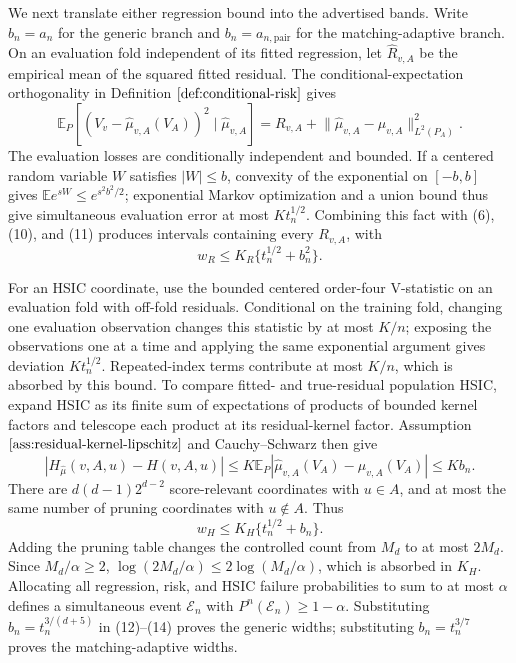 We next translate either regression bound into the advertised bands. Write \(b_n=a_n\) for the generic branch and \(b_n=a_{n,\mathrm{pair}}\) for the matching-adaptive branch. On an evaluation fold independent of its fitted regression, let \(\widehat R_{v,A}\) be the empirical mean of the squared fitted residual. The conditional-expectation orthogonality in Definition \(\ref{def:conditional-risk}\) gives
\[
 \mathbb E_P\!\left[(V_v-\widehat\mu_{v,A}(V_A))^2\mid\widehat\mu_{v,A}\right]
 =R_{v,A}+\lVert\widehat\mu_{v,A}-\mu_{v,A}\rVert_{L^2(P_A)}^2. \tag{11}
\]
The evaluation losses are conditionally independent and bounded. If a centered random variable \(W\) satisfies \(|W|\le b\), convexity of the exponential on \([-b,b]\) gives \(\mathbb E e^{sW}\le e^{s^2b^2/2}\); exponential Markov optimization and a union bound thus give simultaneous evaluation error at most \(K t_n^{1/2}\). Combining this fact with (6), (10), and (11) produces intervals containing every \(R_{v,A}\), with
\[
 w_R\le K_R\{t_n^{1/2}+b_n^2\}. \tag{12}
\]

For an HSIC coordinate, use the bounded centered order-four V-statistic on an evaluation fold with off-fold residuals. Conditional on the training fold, changing one evaluation observation changes this statistic by at most \(K/n\); exposing the observations one at a time and applying the same exponential argument gives deviation \(K t_n^{1/2}\). Repeated-index terms contribute at most \(K/n\), which is absorbed by this bound. To compare fitted- and true-residual population HSIC, expand HSIC as its finite sum of expectations of products of bounded kernel factors and telescope each product at its residual-kernel factor. Assumption \(\ref{ass:residual-kernel-lipschitz}\) and Cauchy--Schwarz then give
\[
 \left|H_{\widehat\mu}(v,A,u)-H(v,A,u)\right|
 \le K\mathbb E_P
 \left|\widehat\mu_{v,A}(V_A)-\mu_{v,A}(V_A)\right|
 \le K b_n. \tag{13}
\]
There are \(d(d-1)2^{d-2}\) score-relevant coordinates with \(u\in A\), and at most the same number of pruning coordinates with \(u\notin A\). Thus
\[
 w_H\le K_H\{t_n^{1/2}+b_n\}. \tag{14}
\]
Adding the pruning table changes the controlled count from \(M_d\) to at most \(2M_d\). Since \(M_d/\alpha\ge2\), \(\log(2M_d/\alpha)\le2\log(M_d/\alpha)\), which is absorbed in \(K_H\). Allocating all regression, risk, and HSIC failure probabilities to sum to at most \(\alpha\) defines a simultaneous event \(\mathcal E_n\) with \(P^n(\mathcal E_n)\ge1-\alpha\). Substituting \(b_n=t_n^{3/(d+5)}\) in (12)--(14) proves the generic widths; substituting \(b_n=t_n^{3/7}\) proves the matching-adaptive widths.

